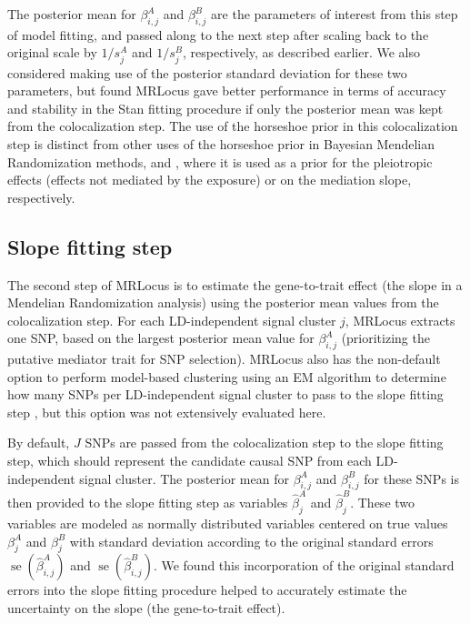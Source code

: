 \documentclass[11pt]{article}
\DeclareMathOperator{\se}{\textrm{se}}
\begin{document}
The posterior mean for $\beta_{i,j}^A$ and $\beta_{i,j}^B$ are the
parameters of interest from this step of model fitting, and passed
along to the next step after scaling back to the original scale by
$1/s_j^A$ and $1/s_j^B$, respectively, as described earlier.
We also considered making use of the posterior standard deviation
for these two parameters, but found MRLocus gave better performance in
terms of accuracy and stability in the Stan fitting procedure if only
the posterior mean was kept from the colocalization step. 
The use of the horseshoe prior in this colocalization step
is distinct from other uses of the horseshoe prior in Bayesian
Mendelian Randomization methods, \citet{Berzuini2018} and
\citet{Uche2019}, where it is used as a prior for the
pleiotropic effects (effects not mediated by the exposure) or on the
mediation slope, respectively.

\subsection{Slope fitting step} \label{sec:slope}

The second step of MRLocus is to estimate the gene-to-trait effect
(the slope in a Mendelian Randomization analysis) using the
posterior mean values from the colocalization step. For each
LD-independent signal cluster $j$, MRLocus extracts one SNP, based on the
largest posterior mean value for $\beta_{i,j}^A$ (prioritizing the
putative mediator trait for SNP selection). MRLocus also has the
non-default option to perform model-based clustering using 
an EM algorithm to determine how many SNPs per LD-independent
signal cluster to pass to the slope fitting step \citep{mclust}, but
this option was not extensively evaluated here.

By default, $J$ SNPs are passed from the colocalization step to the
slope fitting step, which should represent the candidate causal SNP
from each LD-independent signal cluster. The posterior mean for
$\beta_{i,j}^A$ and $\beta_{i,j}^B$ for these SNPs is then provided to
the slope fitting step as variables $\widehat{\beta}_j^A$ and
$\widehat{\beta}_j^B$. These two variables
are modeled as normally distributed variables centered on
true values $\beta_j^A$ and $\beta_j^B$
with standard deviation according to the original standard errors
$\se(\widehat{\beta}_{i,j}^A)$ and
$\se(\widehat{\beta}_{i,j}^B)$. We found this incorporation of the
original standard errors into the slope fitting procedure helped to
accurately estimate the uncertainty on the slope (the gene-to-trait
effect). 
\end{document}
